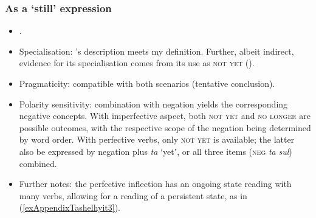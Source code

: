 \subsubsection{As a  \lq still\rq{ }expression}
\begin{itemize}
	\item \textcite{Fanego2021}.
	\item Specialisation: \citeauthor{Fanego2021}'s description meets my definition. Further, albeit indirect, evidence for its specialisation comes from its use as \textsc{not yet} ().
	\item Pragmaticity: compatible with both scenarios (tentative conclusion).
	\item Polarity sensitivity: combination with negation yields the corresponding negative concepts. With imperfective aspect, both \textsc{not yet} and \textsc{no longer} are possible outcomes, with the respective scope of the negation being determined by word order. With perfective verbs, only \textsc{not yet} is available; the latter also be expressed by negation plus \textit{ta} \lq yetʼ, or all three items (\textsc{neg} \textit{ta} \textit{sul}) combined.
	\item Further notes: the perfective inflection has an ongoing state reading with many verbs, allowing for a reading of a persistent state, as in (\ref{exAppendixTashelhyit3}).
\end{itemize}
